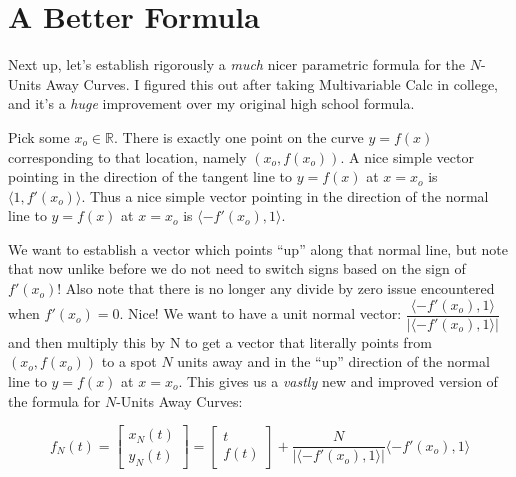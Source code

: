 \newcommand\bvec{\langle -f'(t), 1 \rangle}

\newcommand{\betterFormula}{

  \begin{equation} \tag{2}
    f_N(t) =
    \begin{bmatrix}
      x_N(t) \\
      y_N(t)
    \end{bmatrix} =
    \begin{bmatrix}
        t \\ f(t)
    \end{bmatrix} +
    \dfrac{N}{|\bvec|} \bvec
  \end{equation}

}

\renewcommand\bvec{\langle -f'(x_o), 1 \rangle}

\section{A Better Formula}

Next up, let’s establish rigorously a \textit{much} nicer parametric formula for the $N$-Units Away Curves. I figured this out after taking Multivariable Calc in college, and it’s a \textit{huge} improvement over my original high school formula.

Pick some $x_o \in \mathbb{R}$. There is exactly one point on the curve $y = f(x)$ corresponding to that location, namely $(x_o , f(x_o))$. A nice simple vector pointing in the direction of the tangent line to $y = f(x)$ at $x = x_o$ is $\langle 1, f'(x_o) \rangle$. Thus a nice simple vector
pointing in the direction of the normal line to $y = f(x)$ at $x = x_o$ is $\langle -f'(x_o), 1 \rangle$.

We want to establish a vector which points ``up'' along that normal line, but note that now unlike before we do not need to switch signs based on the sign of $f'(x_o)$! Also note that there is no longer any divide by zero issue encountered when $f'(x_o) = 0$. Nice! We want to have a unit normal vector: $\dfrac{\bvec}{|\bvec|}$ and then multiply this by N to get a vector that literally points from $(x_o, f(x_o))$ to a spot $N$ units away and in the ``up'' direction of the normal line to $y = f(x)$ at $x = x_o$. This gives us a \textit{vastly} new and improved version of the formula for $N$-Units Away Curves:

\betterFormula
